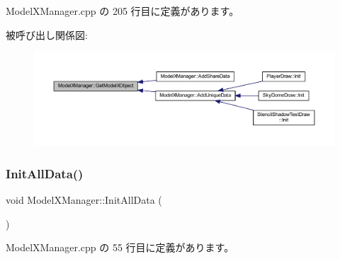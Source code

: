 Model\+X\+Manager.\+cpp の 205 行目に定義があります。

被呼び出し関係図\+:\nopagebreak
\begin{figure}[H]
\begin{center}
\leavevmode
\includegraphics[width=350pt]{class_model_x_manager_a70cc89b8314e5e91b74770606c734c97_icgraph}
\end{center}
\end{figure}
\mbox{\label{class_model_x_manager_a8d7965d9eaa41fcf0297eebea287ee82}} 
\subsubsection{\texorpdfstring{Init\+All\+Data()}{InitAllData()}}
{\footnotesize\ttfamily void Model\+X\+Manager\+::\+Init\+All\+Data (\begin{DoxyParamCaption}{ }\end{DoxyParamCaption})\hspace{0.3cm}{\ttfamily [static]}}



 Model\+X\+Manager.\+cpp の 55 行目に定義があります。


